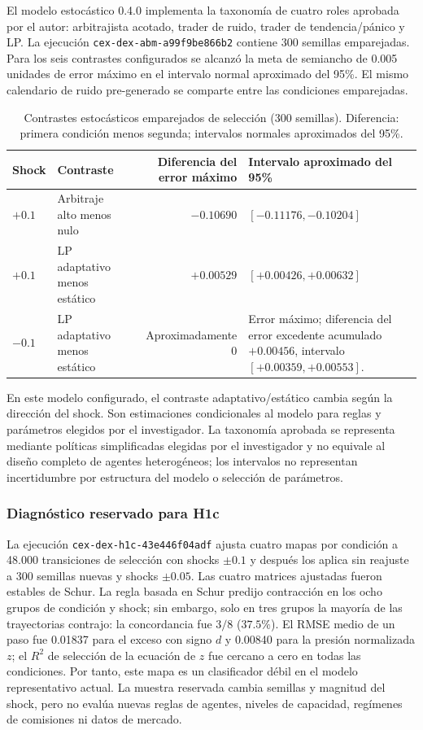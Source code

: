 El modelo estocástico 0.4.0 implementa la taxonomía de cuatro roles aprobada por el autor:
arbitrajista acotado, trader de ruido, trader de tendencia/pánico y LP. La ejecución
\texttt{cex-dex-abm-a99f9be866b2} contiene 300 semillas emparejadas. Para los seis
contrastes configurados se alcanzó la meta de semiancho de 0.005 unidades de error
máximo en el intervalo normal aproximado del 95\%. El mismo calendario de ruido
pre-generado se comparte entre las condiciones emparejadas.

\begin{table}[!ht]
\centering
\scriptsize
\caption{Contrastes estocásticos emparejados de selección (300 semillas). Diferencia:
primera condición menos segunda; intervalos normales aproximados del 95\%.}
\begin{tabularx}{\textwidth}{@{}>{\raggedright\arraybackslash}p{3.3cm} >{\raggedright\arraybackslash}p{3cm} r X@{}}
\toprule
\textbf{Shock} & \textbf{Contraste} & \textbf{Diferencia del error máximo} &
\textbf{Intervalo aproximado del 95\%} \\
\midrule
$+0.1$ & Arbitraje alto menos nulo & $-0.10690$ & $[-0.11176,-0.10204]$ \\
$+0.1$ & LP adaptativo menos estático & $+0.00529$ & $[+0.00426,+0.00632]$ \\
$-0.1$ & LP adaptativo menos estático & Aproximadamente $0$ & Error máximo; diferencia
  del error excedente acumulado $+0.00456$, intervalo $[+0.00359,+0.00553]$. \\
\bottomrule
\end{tabularx}
\end{table}

En este modelo configurado, el contraste adaptativo/estático cambia según la dirección
del shock. Son estimaciones condicionales al modelo para reglas y parámetros elegidos
por el investigador. La taxonomía aprobada se representa mediante políticas simplificadas elegidas por el
investigador y no equivale al diseño completo de agentes heterogéneos; los intervalos
no representan incertidumbre por estructura del modelo o selección de parámetros.

\subsubsection{Diagnóstico reservado para H1c}

La ejecución \texttt{cex-dex-h1c-43e446f04adf} ajusta cuatro mapas por condición a
48.000 transiciones de selección con shocks $\pm0.1$ y después los aplica sin reajuste
a 300 semillas nuevas y shocks $\pm0.05$. Las cuatro matrices ajustadas fueron
estables de Schur. La regla basada en Schur predijo contracción en los ocho grupos de
condición y shock; sin embargo, solo en tres grupos la mayoría de las trayectorias
contrajo: la concordancia fue $3/8$ ($37.5\%$). El RMSE medio de un paso fue 0.01837
para el exceso con signo $d$ y 0.00840 para la presión normalizada $z$; el $R^2$ de
selección de la ecuación de $z$ fue cercano a cero en todas las condiciones. Por tanto,
este mapa es un clasificador débil en el modelo representativo actual. La muestra
reservada cambia semillas y magnitud del shock, pero no evalúa nuevas reglas de agentes,
niveles de capacidad, regímenes de comisiones ni datos de mercado.

